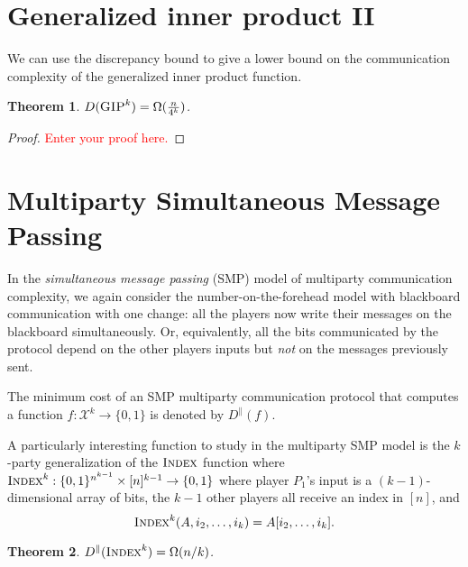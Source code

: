 \documentclass[11pt]{amsart}
\theoremstyle{plain}
\newtheorem{theorem}{Theorem}
\theoremstyle{definition}
\theoremstyle{plain}
\newcommand{\calX}{\mathcal{X}}
\newcommand{\GIP}{\textsc{GIP}}
\newcommand{\Index}{\textsc{Index}}
\newcommand{\replacethistext}[1]{\textcolor{red}{#1}}
\begin{document}
\newpage 
\section{Generalized inner product II}

We can use the discrepancy bound to give a lower bound on the communication complexity of the generalized inner product function.

\begin{theorem}
$D(\GIP^k) = \Omega(\frac{n}{4^k})$.
\end{theorem}

\begin{proof}
\replacethistext{Enter your proof here.}
\end{proof}



\newpage 
\section{Multiparty Simultaneous Message Passing}

In the \emph{simultaneous message passing} (SMP) model of multiparty communication complexity, we again consider the number-on-the-forehead model with blackboard communication with one change: all the players now write their messages on the blackboard simultaneously. Or, equivalently, all the bits communicated by the protocol depend on the other players inputs but \emph{not} on the messages previously sent.

The minimum cost of an SMP multiparty communication protocol that computes a function $f : \calX^k \to \{0,1\}$ is denoted by $D^\parallel(f)$.

A particularly interesting function to study in the multiparty SMP model is the $k$-party generalization of the $\Index$ function where $\Index^k : \{0,1\}^{n^{k-1}} \times [n]^{k-1} \to \{0,1\}$ where player $P_1$'s input is a $(k-1)$-dimensional array of bits, the $k-1$ other players all receive an index in $[n]$, and
\[
\Index^k(A,i_2,\ldots,i_k) = A[i_2,\ldots,i_k].
\]

\begin{theorem}
$D^\parallel(\Index^k) = \Omega(n/k)$.
\end{theorem}
\end{document}

